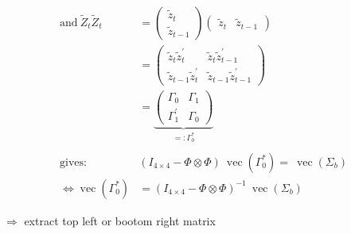 \documentclass[12pt,a4paper]{article}
\renewcommand{\vec}{\operatorname{vec}}
\newenvironment{Shaded}{\begin{snugshade}}{\end{snugshade}}
\newcommand{\DataTypeTok}[1]{\textcolor[rgb]{0.13,0.29,0.53}{#1}}
\newcommand{\DecValTok}[1]{\textcolor[rgb]{0.00,0.00,0.81}{#1}}
\newcommand{\KeywordTok}[1]{\textcolor[rgb]{0.13,0.29,0.53}{\textbf{#1}}}
\newcommand{\NormalTok}[1]{#1}
\newcommand{\OperatorTok}[1]{\textcolor[rgb]{0.81,0.36,0.00}{\textbf{#1}}}
\newcommand{\StringTok}[1]{\textcolor[rgb]{0.31,0.60,0.02}{#1}}
\begin{document}
\begin{align*}
  \text{and} \ \tilde{Z}_t \tilde{Z}_t & = \begin{pmatrix} \tilde{z}_t \\ \tilde{z}_{t -1} \end{pmatrix}   \begin{pmatrix} \tilde{z}_t & \tilde{z}_{t -1} \end{pmatrix} \\
  & =  \begin{pmatrix} \tilde{z}_t \tilde{z}_t^{'} & \tilde{z}_t \tilde{z}_{t -1}^{'} \\
   \tilde{z}_{t -1} \tilde{z}_t^{'} & \tilde{z}_{t -1} \tilde{z}_{t -1}^{'} \end{pmatrix} \\
   & = \underbrace{\begin{pmatrix} \Gamma_0 & \Gamma_1 \\ \Gamma_1^{'} & \Gamma_0 \end{pmatrix}}_{=: \Gamma_0^{*}}\\
   \\
   \text{gives:} & \left( I_{4 \times 4} - \Phi \otimes \Phi  \right) \ \vec(\Gamma_0^{*}) = \ \vec(\Sigma_b)\\
   \Leftrightarrow \vec(\Gamma_0^{*}) & = \left( I_{4 \times 4} - \Phi \otimes \Phi  \right)^{-1}  \ \vec(\Sigma_b)
\end{align*}

\(\Rightarrow\) extract top left or bootom right matrix

\begin{Shaded}
\end{Shaded}
\end{document}
